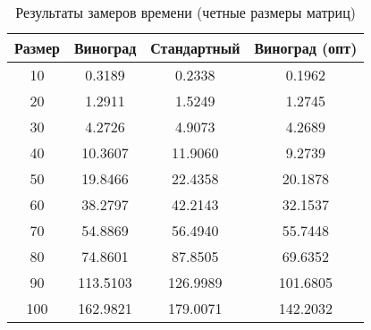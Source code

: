 \begin{table}[h]
    \begin{center}
        \begin{threeparttable}
        \captionsetup{justification=raggedright,singlelinecheck=off}
        \caption{Результаты замеров времени (четные размеры матриц)}
        \label{tbl:time_mes_even}
        \begin{tabular}{|c|c|c|c|}
            \hline
            Размер & Виноград & Стандартный & Виноград (опт) \\
            \hline
            10 & 0.3189 & 0.2338 & 0.1962 \\
            \hline
            20 & 1.2911 & 1.5249 & 1.2745 \\
            \hline
            30 & 4.2726 & 4.9073 & 4.2689 \\
            \hline
            40 & 10.3607 & 11.9060 & 9.2739 \\
            \hline
            50 & 19.8466 & 22.4358 & 20.1878 \\
            \hline
            60 & 38.2797 & 42.2143 & 32.1537 \\
            \hline
            70 & 54.8869 & 56.4940 & 55.7448 \\
            \hline
            80 & 74.8601 & 87.8505 & 69.6352 \\
            \hline
            90 & 113.5103 & 126.9989 & 101.6805 \\
            \hline
            100 & 162.9821 & 179.0071 & 142.2032 \\
            \hline
		\end{tabular}
    \end{threeparttable}
\end{center}
\end{table}

\clearpage


